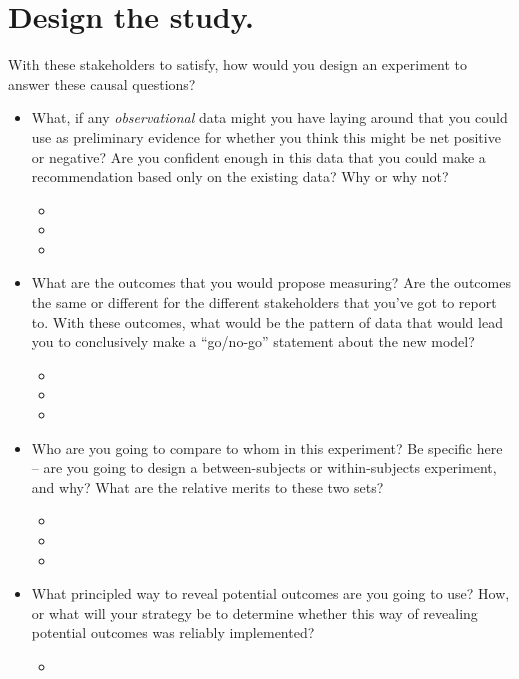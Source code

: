 \documentclass{article}
\begin{document}
\section{Design the study.}
\label{sec:org9ac9dde}
With these stakeholders to satisfy, how would you design an experiment to answer these causal questions? 

\begin{itemize}
\item What, if any \emph{observational} data might you have laying around that you could use as preliminary evidence for whether you think this might be net positive or negative? Are you confident enough in this data that you could make a recommendation based only on the existing data? Why or why not?
\begin{itemize}
\item 

\item 

\item 
\end{itemize}
\item What are the outcomes that you would propose measuring? Are the outcomes the same or different for the different stakeholders that you've got to report to. With these outcomes, what would be the pattern of data that would lead you to conclusively make a ``go/no-go'' statement about the new model?
\begin{itemize}
\item 

\item 

\item 
\end{itemize}
\item Who are you going to compare to whom in this experiment? Be specific here -- are you going to design a between-subjects or within-subjects experiment, and why? What are the relative merits to these two sets?
\begin{itemize}
\item 

\item 

\item 
\end{itemize}
\item What principled way to reveal potential outcomes are you going to use? How, or what will your strategy be to determine whether this way of revealing potential outcomes was reliably implemented?
\begin{itemize}
\item 


\end{itemize}
\end{itemize}
\end{document}
